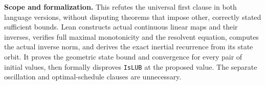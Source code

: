 \documentclass[11pt]{article}
\begin{document}
\textbf{Scope and formalization.} This refutes the universal first clause in both language versions, without disputing theorems that impose other, correctly stated sufficient bounds. Lean constructs actual continuous linear maps and their inverses, verifies full maximal monotonicity and the resolvent equation, computes the actual inverse norm, and derives the exact inertial recurrence from its state orbit. It proves the geometric state bound and convergence for every pair of initial values, then formally disproves \texttt{IsLUB} at the proposed value. The separate oscillation and optimal-schedule clauses are unnecessary.
\end{document}
